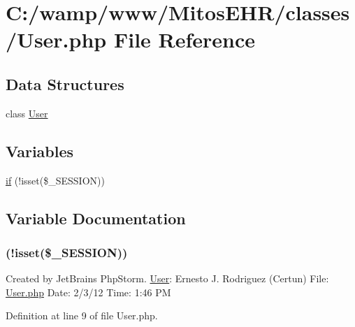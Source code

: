 \hypertarget{_user_8php}{\section{\-C\-:/wamp/www/\-Mitos\-E\-H\-R/classes/\-User.php \-File \-Reference}
\label{_user_8php}
}
\subsection*{\-Data \-Structures}
\begin{DoxyCompactItemize}
\item 
class \hyperlink{class_user}{\-User}
\end{DoxyCompactItemize}
\subsection*{\-Variables}
\begin{DoxyCompactItemize}
\item 
\hyperlink{_user_8php_a8ceca98aa29914fd2479a84a8d2242fb}{if} (!isset(\$\-\_\-\-S\-E\-S\-S\-I\-O\-N))
\end{DoxyCompactItemize}


\subsection{\-Variable \-Documentation}
\hypertarget{_user_8php_a8ceca98aa29914fd2479a84a8d2242fb}{
\subsubsection[{if}]{(!isset(\$\-\_\-\-S\-E\-S\-S\-I\-O\-N))}}\label{_user_8php_a8ceca98aa29914fd2479a84a8d2242fb}
\-Created by \-Jet\-Brains \-Php\-Storm. \hyperlink{class_user}{\-User}\-: \-Ernesto \-J. \-Rodriguez (\-Certun) \-File\-: \hyperlink{_user_8php}{\-User.\-php} \-Date\-: 2/3/12 \-Time\-: 1\-:46 \-P\-M 

\-Definition at line 9 of file \-User.\-php.

